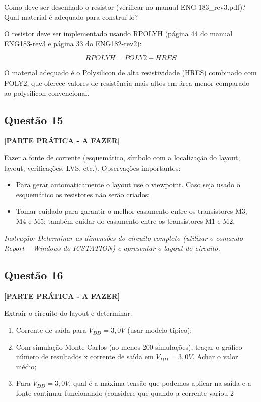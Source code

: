 \documentclass[12pt,a4paper]{article}
\begin{document}
Como deve ser desenhado o resistor (verificar no manual ENG-183\_rev3.pdf)? Qual material é adequado para construí-lo?

O resistor deve ser implementado usando RPOLYH (página 44 do manual ENG183-rev3 e página 33 do ENG182-rev2):

$$RPOLYH = POLY2 + HRES$$

O material adequado é o Polysilicon de alta resistividade (HRES) combinado com POLY2, que oferece valores de resistência mais altos em área menor comparado ao polysilicon convencional.

\subsection*{Questão 15}

\textbf{[PARTE PRÁTICA - A FAZER]}

Fazer a fonte de corrente (esquemático, símbolo com a localização do layout, layout, verificações, LVS, etc.). Observações importantes:

\begin{itemize}
    \item Para gerar automaticamente o layout use o viewpoint. Caso seja usado o esquemático os resistores não serão criados;
    \item Tomar cuidado para garantir o melhor casamento entre os transistores M3, M4 e M5; também cuidar do casamento entre os transistores M1 e M2.
\end{itemize}

\textit{Instrução: Determinar as dimensões do circuito completo (utilizar o comando Report – Windows do ICSTATION) e apresentar o layout do circuito.}

\subsection*{Questão 16}

\textbf{[PARTE PRÁTICA - A FAZER]}

Extrair o circuito do layout e determinar:

\begin{enumerate}
    \item Corrente de saída para $V_{DD} = 3,0V$ (usar modelo típico);
    \item Com simulação Monte Carlos (ao menos 200 simulações), traçar o gráfico número de resultados x corrente de saída em $V_{DD} = 3,0V$. Achar o valor médio;
    \item Para $V_{DD} = 3,0V$, qual é a máxima tensão que podemos aplicar na saída e a fonte continuar funcionando (considere que quando a corrente variou 2%
\end{enumerate}
\end{document}
